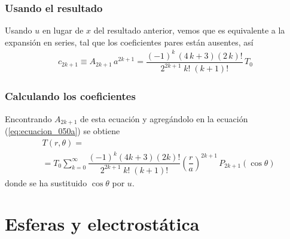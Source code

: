 \begin{frame}
\frametitle{Usando el resultado}
Usando $u$ en lugar de $x$ del resultado anterior, vemos que es equivalente a la expansión en series, tal que los coeficientes pares están ausentes, así
\begin{align*}
c_{2k+1} \equiv A_{2k+1} \, a^{2k+1} = \dfrac{(-1)^{k} \, (4 \, k + 3)(2 \, k)!}{2^{2k+1} \; k! \; (k + 1)!} \, T_{0}
\end{align*}
\end{frame}
\begin{frame}
\frametitle{Calculando los coeficientes}
Encontrando $A_{2k+1}$ de esta ecuación y agregándolo en la ecuación (\ref{eq:ecuacion_050a}) se obtiene
\begin{align*}
&T(r, \theta) = \\[0.5em]
&= T_{0} \sum_{k=0}^{\infty} \dfrac{(-1)^{k} (4 k {+} 3)(2 k)!}{2^{2k+1} \; k! \; (k {+} 1)!} \left( \dfrac{r}{a} \right)^{2k+1} \, P_{2k+1} (\cos \theta)
\end{align*}
donde se ha sustituido $\cos \theta$ por $u$.
\end{frame}
\section{Esferas y electrostática}
